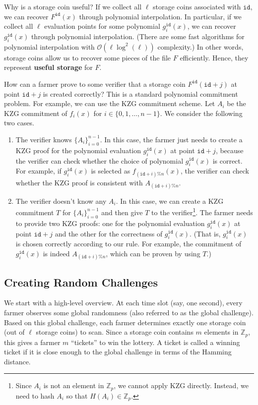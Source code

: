 \documentclass[conference]{IEEEtran}
\newcommand{\Fp}{\mathbb{Z}_p}
\newcommand{\id}{\texttt{id}}
\begin{document}
Why is a storage coin useful? If we collect all $\ell$ storage coins associated with $\id$, we can recover $F^{\id}(x)$ through polynomial interpolation.
In particular, if we collect all $\ell$ evaluation points for some polynomial $g_i^{\id}(x)$, we can recover $g_i^{\id}(x)$ through polynomial interpolation.
(There are some fast algorithms for polynomial interpolation with $\mathcal{O}(\ell \log^2(\ell))$ complexity.)
In other words, storage coins allow us to recover some pieces of the file $F$ efficiently. Hence, they represent {\bf useful storage} for $F$.

How can a farmer prove to some verifier that a storage coin $F^{\id}(\id + j)$ at point $\id + j$ is created correctly? This is a standard polynomial commitment problem. For example, we can use the
KZG commitment scheme. Let $A_i$ be the KZG commitment of $f_i(x)$ for $i \in \{0, 1, \ldots, n-1\}$. 
We consider the following two cases.
\begin{enumerate}
    \item The verifier knows $\{ A_i \}_{i = 0}^{n - 1}$. In this case, the farmer just needs to create a KZG proof for the polynomial evaluation $g_i^{\id}(x)$ at point $\id + j$, because the verifier can check whether the choice of polynomial $g_i^{\id}(x)$ is correct. For example, if $g_i^{\id}(x)$ is selected as $f_{(\id + i)\% n}(x)$, the verifier can check whether the KZG proof is consistent with $A_{(\id + i)\% n}$. 
    \item The verifier doesn't know any $A_i$. In this case, we can create a KZG commitment $T$ for $\{ A_i \}_{i = 0}^{n - 1}$ and then give $T$ to the verifier\footnote{Since $A_i$ is not an element in $\Fp$, we cannot apply KZG directly. Instead, we need to hash $A_i$ so that $H(A_i) \in \Fp$.}.  The farmer needs to provide two KZG proofs: one for the polynomial evaluation $g_i^{\id}(x)$ at point $\id + j$ and the other for the correctness of $g_i^{\id}(x)$. (That is, $g_i^{\id}(x)$ is chosen correctly according to our rule. For example, the commitment of $g_i^{\id}(x)$ is indeed $A_{(\id + i)\% n}$, which can be proven by using $T$.)
\end{enumerate}

\subsection{Creating Random Challenges}

We start with a high-level overview. At each time slot (say, one second), every farmer observes some global randomness (also referred to as the global challenge). 
Based on this global challenge, each farmer determines exactly one storage coin (out of $\ell$ storage coins) to scan. Since a storage coin contains $m$ elements in $\Fp$, this gives a farmer $m$ ``tickets'' to win the lottery. A ticket is called a winning ticket if it is close enough to the global challenge in terms of the Hamming distance.
\end{document}
